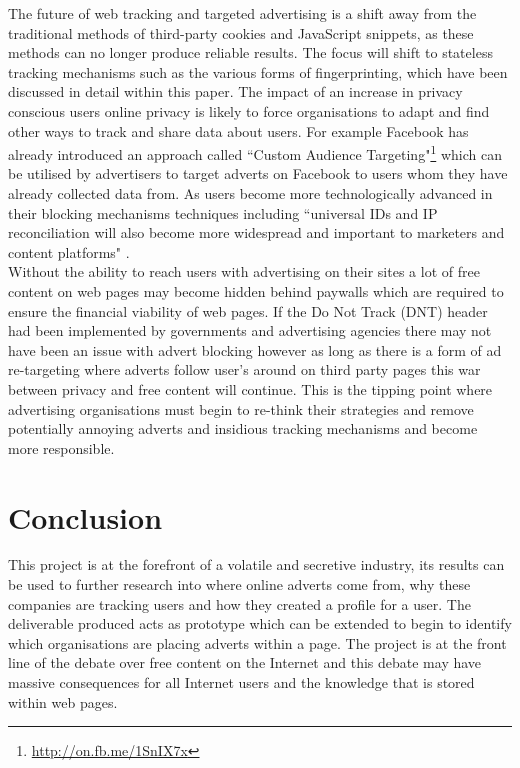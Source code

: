 \documentclass[12pt]{article}
\begin{document}
The future of web tracking and targeted advertising is a shift away from the traditional methods of third-party cookies and JavaScript snippets, as these methods can no longer produce reliable results. The focus will shift to stateless tracking mechanisms such as the various forms of fingerprinting, which have been discussed in detail within this paper. The impact of an increase in privacy conscious users online privacy is likely to force organisations to adapt and find other ways to track and share data about users. For example Facebook has already introduced an approach called ``Custom Audience  Targeting"\footnote{\url{http://on.fb.me/1SnIX7x}} which can be utilised by advertisers to target adverts on Facebook to users whom they have already collected data from. As users become more technologically advanced in their blocking mechanisms techniques including ``universal IDs and IP reconciliation will also become more widespread and important to marketers and content platforms" \parencite{tippingPoint}. \\

Without the ability to reach users with advertising on their sites a lot of free content on web pages may become hidden behind paywalls which are required to ensure the financial viability of web pages. If the Do Not Track (DNT) header had been implemented by governments  and advertising agencies there may not have been an issue with advert blocking however as long as there is a form of ad re-targeting where adverts follow user's around on third party pages this war between privacy and free content will continue. This is the tipping point where advertising organisations must begin to re-think their strategies and remove potentially annoying adverts and insidious tracking mechanisms and become more responsible. 

\pagebreak

\section{Conclusion} \label{conclusion}
This project is at the forefront of a volatile and secretive industry, its results can be used to further research into where online adverts come from, why these companies are tracking users and how they created a profile for a user. The deliverable produced acts as prototype which can be extended to begin to identify which organisations are placing adverts within a page. The project is at the front line of the debate over free content on the Internet and this debate may have massive consequences for all Internet users and the knowledge that is stored within web pages. \\
\end{document}

